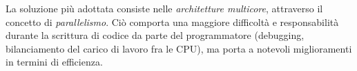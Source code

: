 \documentclass[class=book, crop=false]{standalone}
\begin{document}
La soluzione più adottata consiste nelle \emph{architetture multicore}, attraverso il concetto di \emph{parallelismo}. Ciò comporta una maggiore difficoltà e responsabilità durante la scrittura di codice da parte del programmatore (debugging, bilanciamento del carico di lavoro fra le CPU), ma porta a notevoli miglioramenti in termini di efficienza.
\end{document}
